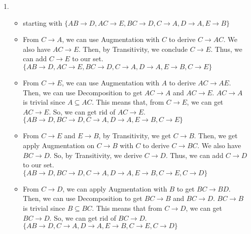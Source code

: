 \documentclass[12pt]{article}
\begin{document}
\begin{enumerate}
  \item
    \begin{itemize}
      \item starting with $\{AB \longrightarrow D, AC \longrightarrow E, BC
            \longrightarrow D, C \longrightarrow A, D \longrightarrow A, E
            \longrightarrow B\}$
      \item From $C \longrightarrow A$, we can use Augmentation with $C$ to
            derive $C \longrightarrow AC$. We also have $AC \longrightarrow E$.
            Then, by Transitivity, we conclude $C \longrightarrow E$. Thus, we
            can add $C \longrightarrow E$ to our set. \\
            $\{AB \longrightarrow D, AC \longrightarrow E, BC \longrightarrow
            D, C \longrightarrow A, D \longrightarrow A, E \longrightarrow B, C
            \longrightarrow E\}$
      \item From $C \longrightarrow E$, we can use Augmentation with $A$ to
            derive $AC \longrightarrow AE$. Then, we can use Decomposition to
            get $AC \longrightarrow A$ and $AC \longrightarrow E$. $AC
            \longrightarrow A$ is trivial since $A \subseteq AC$. This means
            that, from $C \longrightarrow E$, we can get $AC \longrightarrow E$.
            So, we can get rid of $AC \longrightarrow E$. \\
            $\{AB \longrightarrow D, BC \longrightarrow D, C \longrightarrow A,
            D \longrightarrow A, E \longrightarrow B, C \longrightarrow E\}$
      \item From $C \longrightarrow E$ and $E \longrightarrow B$, by
            Transitivity, we get $C \longrightarrow B$. Then, we get apply
            Augmentation on $C \longrightarrow B$ with $C$ to derive $C
            \longrightarrow BC$. We also have $BC \longrightarrow D$. So, by
            Transitivity, we derive $C \longrightarrow D$. Thus, we can add $C
            \longrightarrow D$ to our set. \\
            $\{AB \longrightarrow D, BC \longrightarrow D, C \longrightarrow A,
            D \longrightarrow A, E \longrightarrow B, C \longrightarrow E, C
            \longrightarrow D\}$
      \item From $C \longrightarrow D$, we can apply Augmentation with $B$ to
            get $BC \longrightarrow BD$. Then, we can use Decomposition to get
            $BC \longrightarrow B$ and $BC \longrightarrow D$. $BC
            \longrightarrow B$ is trivial since $B \subseteq BC$. This means
            that from $C \longrightarrow D$, we can get $BC \longrightarrow D$.
            So, we can get rid of $BC \longrightarrow D$. \\
            $\{AB \longrightarrow D, C \longrightarrow A, D \longrightarrow A, E
            \longrightarrow B, C \longrightarrow E, C \longrightarrow D\}$
    \end{itemize}
  
  

\end{enumerate}
\end{document}
